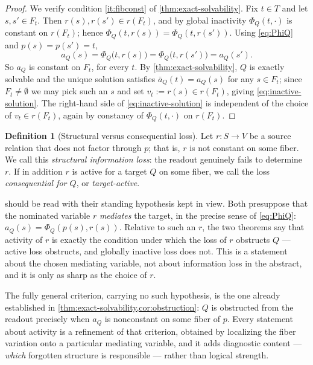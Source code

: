\documentclass[11pt,reqno]{amsart}
\theoremstyle{plain}
\theoremstyle{definition}
\newtheorem{definition}[theorem]{Definition}
\newcommand{\Src}{S}
\newcommand{\Rdt}{T}
\begin{document}
\begin{proof}
We verify condition \eqref{it:fibconst} of \cref{thm:exact-solvability}. Fix $t\in\Rdt$ and let
$s,s'\in F_t$. Then $r(s),r(s')\in r(F_t)$, and by global inactivity $\Phi_Q(t,\cdot)$ is
constant on $r(F_t)$; hence $\Phi_Q(t,r(s))=\Phi_Q(t,r(s'))$. Using \eqref{eq:PhiQ} and
$p(s)=p(s')=t$,
\begin{equation*}
a_Q(s)=\Phi_Q\bigl(t,r(s)\bigr)=\Phi_Q\bigl(t,r(s')\bigr)=a_Q(s').
\end{equation*}
So $a_Q$ is constant on $F_t$, for every $t$. By \cref{thm:exact-solvability}, $Q$ is exactly
solvable and the unique solution satisfies $\bar a_Q(t)=a_Q(s)$ for any $s\in F_t$; since
$F_t\neq\emptyset$ we may pick such an $s$ and set $v_t:=r(s)\in r(F_t)$, giving
\eqref{eq:inactive-solution}. The right-hand side of \eqref{eq:inactive-solution} is independent
of the choice of $v_t\in r(F_t)$, again by constancy of $\Phi_Q(t,\cdot)$ on $r(F_t)$.
\end{proof}

\begin{definition}[Structural versus consequential loss]\label{def:loss-types}
Let $r\colon\Src\to V$ be a source relation that does not factor through $p$; that is, $r$ is not
constant on some fiber. We call this \emph{structural information loss}: the readout genuinely
fails to determine $r$. If in addition $r$ is active for a target $Q$ on some fiber, we call the
loss \emph{consequential for $Q$}, or \emph{target-active}.
\end{definition}

 should be read with their standing hypothesis
kept in view. Both presuppose that the nominated variable $r$ \emph{mediates} the target, in the
precise sense of \eqref{eq:PhiQ}: $a_Q(s)=\Phi_Q(p(s),r(s))$. Relative to such an $r$, the two
theorems say that activity of $r$ is exactly the condition under which the loss of $r$ obstructs
$Q$ --- active loss obstructs, and globally inactive loss does not. This is a statement about the
chosen mediating variable, not about information loss in the abstract, and it is only as sharp as
the choice of $r$.

The fully general criterion, carrying no such hypothesis, is the one already established in
\cref{thm:exact-solvability,cor:obstruction}: $Q$ is obstructed from the readout precisely when
$a_Q$ is nonconstant on some fiber of $p$. Every statement about activity is a refinement of that
criterion, obtained by localizing the fiber variation onto a particular mediating variable, and it
adds diagnostic content --- \emph{which} forgotten structure is responsible --- rather than logical
strength.
\end{document}
